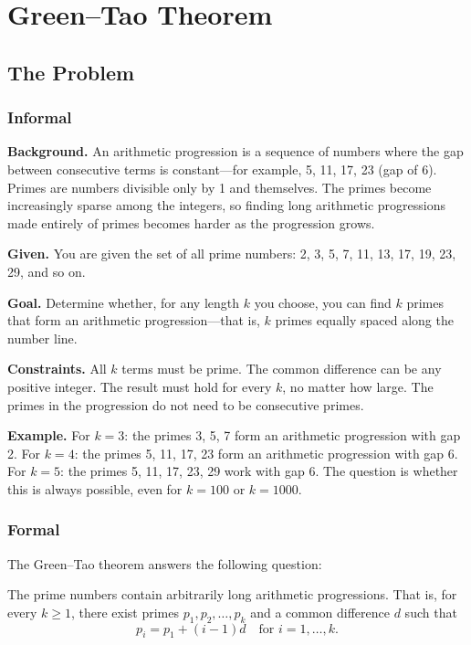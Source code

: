 \let\LocalMacro\relax

\chapter{Green--Tao Theorem}

\section{The Problem}

\subsection{Informal}

\textbf{Background.} An arithmetic progression is a sequence of numbers where the gap between consecutive terms is constant---for example, 5, 11, 17, 23 (gap of 6). Primes are numbers divisible only by 1 and themselves. The primes become increasingly sparse among the integers, so finding long arithmetic progressions made entirely of primes becomes harder as the progression grows.

\textbf{Given.} You are given the set of all prime numbers: 2, 3, 5, 7, 11, 13, 17, 19, 23, 29, and so on.

\textbf{Goal.} Determine whether, for any length $k$ you choose, you can find $k$ primes that form an arithmetic progression---that is, $k$ primes equally spaced along the number line.

\textbf{Constraints.} All $k$ terms must be prime. The common difference can be any positive integer. The result must hold for every $k$, no matter how large. The primes in the progression do not need to be consecutive primes.

\textbf{Example.} For $k = 3$: the primes 3, 5, 7 form an arithmetic progression with gap 2. For $k = 4$: the primes 5, 11, 17, 23 form an arithmetic progression with gap 6. For $k = 5$: the primes 5, 11, 17, 23, 29 work with gap 6. The question is whether this is always possible, even for $k = 100$ or $k = 1000$.

\subsection{Formal}

The Green--Tao theorem answers the following question:
\begin{theorem}
The prime numbers contain arbitrarily long arithmetic progressions. That is, for every $k \geq 1$, there exist primes $p_1, p_2, \ldots, p_k$ and a common difference $d$ such that
\[
p_i = p_1 + (i-1)d \quad \text{for } i = 1, \ldots, k.
\]
\end{theorem}

